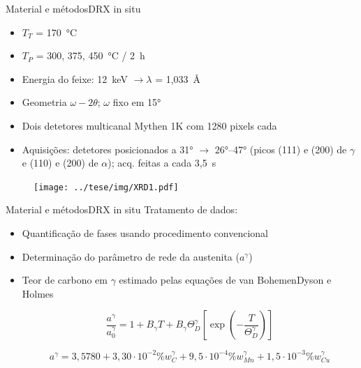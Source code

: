 \begin{frame}{Material e métodos}{DRX in situ}
  \begin{itemize}
    \item $T_T$ = \SI{170}{\degreeCelsius}
    \item $T_P$ = 300, 375, \SI{450}{\degreeCelsius} / 2~h

    \item Energia do feixe: 12~keV $\rightarrow \lambda$ = 1,033~\AA
    \item Geometria $\omega-2\theta$; $\omega$ fixo em 15°
    \item Dois detetores multicanal Mythen 1K com 1280 pixels cada
    \item Aquisições: detetores posicionados a 31° $\rightarrow$ 26°--47° (picos (111) e (200) de $\gamma$ e (110) e (200) de $\alpha$); acq. feitas a cada 3,5~s
  \end{itemize}

  \begin{figure}
    \texttt{[image: ../tese/img/XRD1.pdf]}
  \end{figure}
\end{frame}


\begin{frame}{Material e métodos}{DRX in situ}
  Tratamento de dados:
  \begin{itemize}
    \item Quantificação de fases usando procedimento convencional
    \item Determinação do parâmetro de rede da austenita ($a^\gamma$)
    \item Teor de carbono em $\gamma$ estimado pelas equações de van Bohemen\footnotemark[2] Dyson e Holmes\footnotemark[3]

    $$\frac{a^\gamma}{a_0^\gamma} = 1 + B_\gamma T + B_\gamma \Theta_D^\gamma \left[ \exp{\left( -\frac{T}{\Theta_D^\gamma} \right)}\right]$$

    $$a^\gamma = 3,5780 + 3,30\cdot10^{-2} \%w_C^\gamma + 9,5\cdot10^{-4} \%w_{Mn}^\gamma + 1,5\cdot10^{-3} \%w_{Cu}^\gamma$$
  \end{itemize}

\end{frame}

